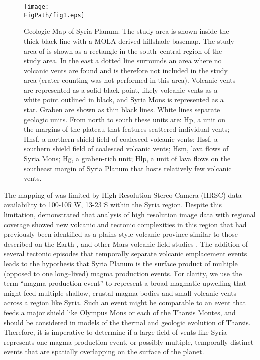 \begin{figure}
	\centering
	\texttt{[image: \\FigPath/fig1.eps]}
	\caption[Geologic Map of Syria Planum]{Geologic Map of Syria Planum. The study area is shown inside the thick black line with a MOLA-derived hillshade basemap. The study area of \citet{baptista2008swarm} is shown as a rectangle in the south--central region of the study area. In the east a dotted line surrounds an area where no volcanic vents are found and is therefore not included in the study area (crater counting was not performed in this area). Volcanic vents are represented as a solid black point, likely volcanic vents as a white point outlined in black, and Syria Mons is represented as a star. Graben are shown as thin black lines. White lines separate geologic units. From north to south these units are: Hp, a unit on the margins of the plateau that features scattered individual vents; Hnsf, a northern shield field of coalesced volcanic vents; Hssf, a southern shield field of coalesced volcanic vents; Hsm, lava flows of Syria Mons; Hg, a graben-rich unit; Hlp, a unit of lava flows on the southeast margin of Syria Planum that hosts relatively few volcanic vents.}
	\label{fig-geomap}
\end{figure}

The mapping of \citet{baptista2008swarm} was limited by High Resolution Stereo Camera (HRSC) data availability to 100-105$^{\circ}$W, 13-23$^{\circ}$S within the Syria region. Despite this limitation, \citet{baptista2008swarm} demonstrated that analysis of high resolution image data with regional coverage showed new volcanic and tectonic complexities in this region that had previously been identified as a plains style volcanic province \citep{Sakimoto2003} similar to those described on the Earth \citep{Greeley1982}, and other Mars volcanic field studies \citep{bleacher2007tharsis,bleacher2009spatial,Hauber2009}. The addition of several tectonic episodes that temporally separate volcanic emplacement events leads to the hypothesis that Syria Planum is the surface product of multiple (opposed to one long--lived) magma production events. For clarity, we use the term ``magma production event'' to represent a broad magmatic upwelling that might feed multiple shallow, crustal magma bodies and small volcanic vents across a region like Syria. Such an event might be comparable to an event that feeds a major shield like Olympus Mons or each of the Tharsis Montes, and should be considered in models of the thermal and geologic evolution of Tharsis. Therefore, it is imperative to determine if a large field of vents like Syria represents one magma production event, or possibly multiple, temporally distinct events that are spatially overlapping on the surface of the planet.


